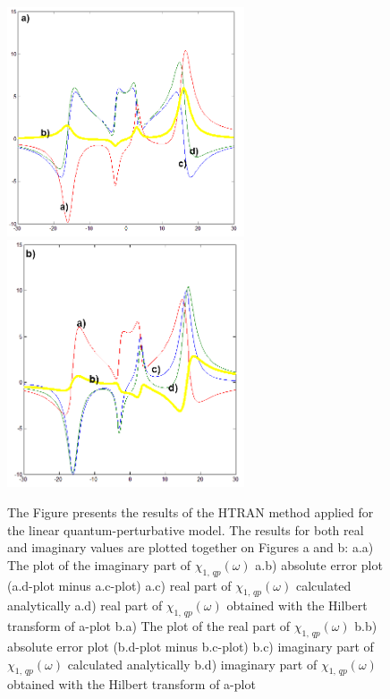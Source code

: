 \documentclass[12pt,twoside,a4paper]{article}
\numberwithin{equation}{subsection}
\numberwithin{figure}{subsection}
\begin{document}
\begin{figure} 
  \includegraphics[width=70mm]{img/htran_qp_2da.png} 
  \includegraphics[width=70mm]{img/htran_qp_2db.png}  
  \caption{The Figure presents the results of the HTRAN method applied for the linear quantum-perturbative model. The results for both real
  and imaginary values are plotted together on Figures a and b:
  a.a) The plot of the imaginary part of ${\chi_{1, \, qp}}(\omega )$ 
  a.b) absolute error plot (a.d-plot minus a.c-plot) 
  a.c) real part of ${\chi_{1, \, qp}}(\omega )$ calculated analytically
  a.d) real part of ${\chi_{1, \, qp}}(\omega )$ obtained with the Hilbert transform of a-plot
  b.a) The plot of the real part of ${\chi_{1, \, qp}}(\omega )$
  b.b) absolute error plot (b.d-plot minus b.c-plot)  
  b.c) imaginary part of ${\chi_{1, \, qp}}(\omega )$ calculated analytically 
  b.d) imaginary part of ${\chi_{1, \, qp}}(\omega )$ obtained with the Hilbert transform of a-plot 
  \label{fig:htran_qp_2d}}
\end{figure}
\end{document}

